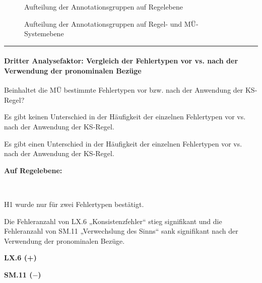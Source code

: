  \begin{figure}[H]
\caption{Aufteilung der Annotationsgruppen auf Regelebene}
 \end{figure}

 \begin{figure}[H]
\caption{Aufteilung der Annotationsgruppen auf Regel- und MÜ-Systemebene}
 \end{figure}

\hrule
\newpage
\paragraph*{Dritter Analysefaktor: Vergleich der Fehlertypen vor vs. nach der Verwendung der pronominalen Bezüge}
\begin{description}[font=\normalfont\bfseries]
\item [Fragestellung:] Beinhaltet die MÜ bestimmte Fehlertypen vor bzw. nach der Anwendung der KS-Regel?
\item [H0 --] Es gibt keinen Unterschied in der Häufigkeit der einzelnen Fehlertypen vor vs. nach der Anwendung der KS-Regel.
\item [H1 --] Es gibt einen Unterschied in der Häufigkeit der einzelnen Fehlertypen vor vs. nach der Anwendung der KS-Regel.
\item [Resultat]
\end{description}
\noindent
\parbox[t]{.8\textwidth}{\textbf{Auf Regelebene:}}\\
\parbox[t]{.8\textwidth}{
H1 wurde nur für zwei Fehlertypen bestätigt.

Die Fehleranzahl von LX.6 „Konsistenzfehler“ stieg signifikant und die Fehleranzahl von SM.11 „Verwechslung des Sinns“ sank signifikant nach der Verwendung der pronominalen Bezüge.
}
\parbox[t]{.04\textwidth}{}
\colorbox{smGreen}{\parbox[t]{.15\textwidth}{
{ \textbf{LX.6 (+)}}

 \textbf{SM.11 ($-$)}\\
 \\
}}

